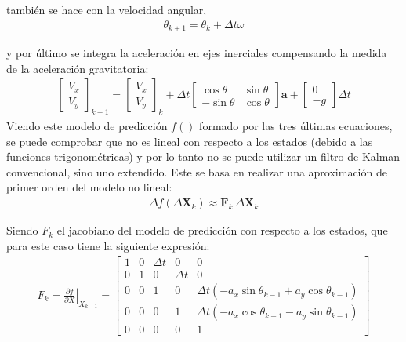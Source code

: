 también se hace con la velocidad angular,
\begin{align}
\theta_{k+1} = \theta_k + \Delta t \omega
\end{align}

y por último se integra la aceleración en ejes inerciales compensando la medida de la aceleración gravitatoria:
\begin{align}
\begin{bmatrix} 
V_x \\ V_y 
\end{bmatrix}_{k+1}
=
\begin{bmatrix} 
V_x \\ V_y 
\end{bmatrix}_k + 
\Delta t
\begin{bmatrix} 
\cos{\theta} & \sin{\theta} \\ -\sin{\theta} & \cos{\theta}
\end{bmatrix}
\bm{a} +  
\begin{bmatrix} 
0 \\ - g 
\end{bmatrix}\Delta t
\end{align}
Viendo este modelo de predicción $f()$ formado por las tres últimas ecuaciones, se puede comprobar que no es lineal con respecto a los estados (debido a las funciones trigonométricas) y por lo tanto no se puede utilizar un filtro de Kalman convencional, sino uno extendido. Este se basa en realizar una aproximación de primer orden del modelo no lineal:
\begin{align}
\Delta f(\Delta \bm{X}_k) \approx \bm{F}_k\ \Delta \bm{X}_k \end{align} 

Siendo $F_k$ el jacobiano del modelo de predicción con respecto a los estados, que para este caso tiene la siguiente expresión:
\begin{align}
F_k =\left. \frac{\partial f}{\partial X}\right| _{X_{k-1}} =  
\begin{bmatrix} 
1 	&0	&\Delta t	&0		&0\\
0 	&1	&0		&\Delta t	&0\\
0 	&0	&1		&0		&\Delta t\left(-a_x\sin{\theta_{k-1}} + a_y\cos{\theta_{k-1}}\right) \\
0 	&0	&0		&1		&\Delta t\left(-a_x\cos{\theta_{k-1}} - a_y\sin{\theta_{k-1}}\right) \\
0 	&0	&0		&0		&1
\end{bmatrix}
\end{align}





